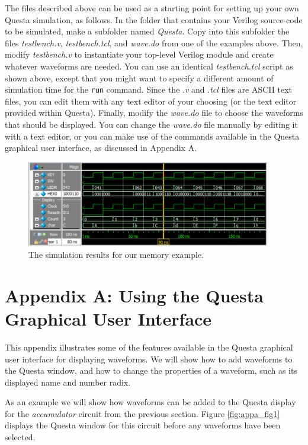 \documentclass[11pt, twoside, pdftex]{article}
\begin{document}
The files described above can be used as a starting point for setting up your own Questa 
simulation, as follows. In the folder that contains your Verilog source-code to be
simulated, make a subfolder named {\it Questa}. Copy into this subfolder the 
files {\it testbench.v}, {\it testbench.tcl}, and {\it wave.do} from one of the examples 
above. Then, modify {\it testbench.v} to instantiate your top-level Verilog module and create 
whatever waveforms are needed. You can use an identical {\it testbench.tcl} script as 
shown above, except that you might want to specify a different amount of simulation time for 
the \texttt{run} command. Since the .{\it v} and .{\it tcl} files are ASCII text
files, you can edit them with any text editor of your choosing (or the text editor
provided within Questa). Finally, modify the {\it wave.do} file to choose the waveforms 
that should be displayed. You can change the {\it wave.do} file manually by editing it with 
a text editor, or you can make use of the commands available in the Questa graphical 
user interface, as discussed in Appendix A.

\begin{figure}[h!]
	\begin{center}
		\includegraphics[width = 0.95\textwidth]{figures/display.png}
	\end{center}
		  \caption{The simulation results for our memory example.}
	\label{fig:gui4}
\end{figure}

\clearpage
\section*{Appendix A: Using the Questa Graphical User Interface}

This appendix illustrates some of the features available in the Questa graphical user
interface for displaying waveforms. We will show how to add waveforms to the Questa
window, and how to change the properties of a waveform, such as its displayed name 
and number radix.

As an example we will show how waveforms can be added to the Questa display for the
{\it accumulator} circuit from the previous section. Figure \ref{fig:appa_fig1} displays the 
Questa window for this circuit before any waveforms have been selected.
\end{document}
